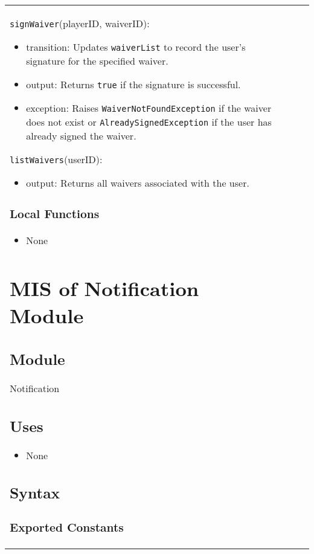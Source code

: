 \documentclass[12pt, titlepage]{article}
\begin{document}
\begin{itemize}
\begin{center}
\begin{tabular}{|p{3cm}|p{4cm}|p{4cm}|p{4cm}|}
\begin{itemize}
\noindent \texttt{signWaiver}(playerID, waiverID):  
\begin{itemize}
    \item transition: Updates \texttt{waiverList} to record the user's signature for the specified waiver.
    \item output: Returns \texttt{true} if the signature is successful.
    \item exception: Raises \texttt{WaiverNotFoundException} if the waiver does not exist or \texttt{AlreadySignedException} if the user has already signed the waiver.
\end{itemize}

\noindent \texttt{listWaivers}(userID):  
\begin{itemize}
    \item output: Returns all waivers associated with the user.
\end{itemize}

\subsubsection{Local Functions}
\begin{itemize}
    \item None
\end{itemize}

\section{MIS of Notification Module} \label{Module:Notification}

\subsection{Module}

Notification

\subsection{Uses}

\begin{itemize}
    \item None
\end{itemize}

\subsection{Syntax}

\subsubsection{Exported Constants}


\end{itemize}
\end{tabular}
\end{center}
\end{itemize}
\end{document}
